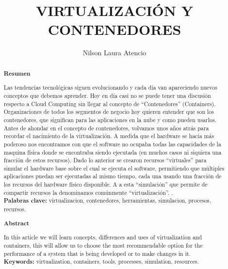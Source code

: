 \documentclass[%
 reprint,
 amsmath,amssymb,
 aps,
]{revtex4-1}
\begin{document}
\title{VIRTUALIZACIÓN Y CONTENEDORES}
\author{Nilson Laura Atencio}
%

\begin{abstract}
\begin{center}
\textbf{Resumen}
\end{center}

Las tendencias tecnológicas siguen evolucionando y cada día van apareciendo nuevos conceptos que debemos aprender. Hoy en día casi no se puede tener una discusión respecto a Cloud Computing sin llegar al concepto de “Contenedores” (Containers).  Organizaciones de todos los segmentos de negocio hoy quieren entender que son los contenedores, que significan para las aplicaciones en la nube y como pueden usarlos.
Antes de ahondar en el concepto de contenedores, volvamos unos años atrás para recordar el nacimiento de la virtualización. A medida que el hardware se hacía más poderoso nos encontramos con que el software no ocupaba todas las capacidades de la maquina física donde se encontraba siendo ejecutada (en muchos casos ni siquiera una fracción de estos recursos). Dado lo anterior se crearon recursos “virtuales” para simular el hardware base sobre el cual se ejecuta el software, permitiendo que múltiples aplicaciones puedan ser ejecutadas al mismo tiempo, cada una usando una fracción de los recursos del hardware físico disponible. A a esta “simulación” que permite de compartir recursos la denominamos comúnmente “virtualización”.
.\\

\textbf{Palabras clave:}   virtualizacion, contenedores, herramientas, simulacion, procesos, recursos.\\

\begin{center}
\textbf{Abstract}
\end{center}
In this article we will learn concepts, differences and uses of virtualization and containers, this will allow us to choose the most recommendable option for the performance of a system that is being developed or to make changes in it.\\
\textbf{Keywords:}   virtualization, containers, tools, processes, simulation, resources.\\

\end{abstract}
\end{document}
